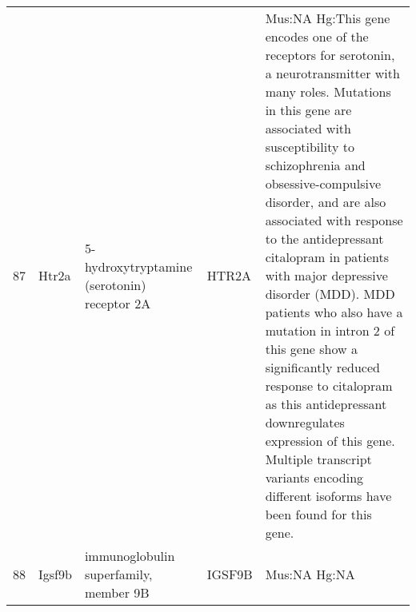 \documentclass[11pt, landscape]{article}   	%
\begin{document}
\begin{table}[ht]
\begin{tabular}{rlp{3cm}lp{12cm}}
  87 & Htr2a & 5-hydroxytryptamine (serotonin) receptor 2A & HTR2A & Mus:NA Hg:This gene encodes one of the receptors for serotonin, a neurotransmitter with many roles. Mutations in this gene are associated with susceptibility to schizophrenia and obsessive-compulsive disorder, and are also associated with response to the antidepressant citalopram in patients with major depressive disorder (MDD). MDD patients who also have a mutation in intron 2 of this gene show a significantly reduced response to citalopram as this antidepressant downregulates expression of this gene. Multiple transcript variants encoding different isoforms have been found for this gene. \\ 
  88 & Igsf9b & immunoglobulin superfamily, member 9B & IGSF9B & Mus:NA Hg:NA \\ 

   \hline
\end{tabular}
\end{table}
\end{document}
